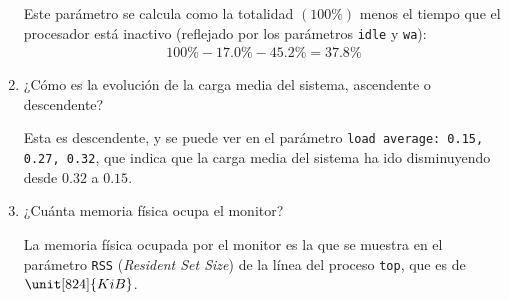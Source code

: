 \begin{ejercicio}
\begin{enumerate}
        Este parámetro se calcula como la totalidad $(100\%)$ menos el tiempo que el procesador está inactivo (reflejado por los parámetros \verb|idle| y \verb|wa|):
        \begin{align*}
            100\% - 17.0\% - 45.2\% = 37.8\%
        \end{align*}
        \item ¿Cómo es la evolución de la carga media del sistema, ascendente o descendente?
        
        Esta es descendente, y se puede ver en el parámetro \verb|load average: 0.15, 0.27, 0.32|, que indica que la carga media del sistema ha ido disminuyendo desde $0.32$ a $0.15$.
        \item ¿Cuánta memoria física ocupa el monitor?
        
        La memoria física ocupada por el monitor es la que se muestra en el parámetro \verb|RSS| (\emph{Resident Set Size}) de la línea del proceso \verb|top|, que es de $\unit[824]{KiB}$.
    \end{enumerate}
\end{ejercicio}
\begin{comment}
    Solución:
    \begin{enumerate}
        \item 257124KiB.
        \item 98.4\%.
        \item 37.8\%.
        \item Descendente.
        \item 824KiB.
    \end{enumerate}
\end{comment}

